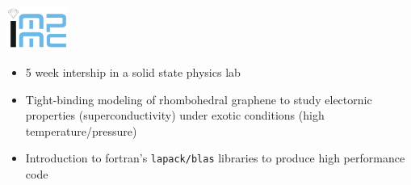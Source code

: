 \noindent
\begin{minipage}{.15\textwidth}
    \centerline{\includegraphics[width=20mm]{img/impmc}}
\end{minipage}%
\hspace{5mm}
\begin{minipage}{.8\textwidth}
    \raggedright
    \begin{itemize}
	\item 5 week intership in a solid state physics lab
	\item Tight-binding modeling of rhombohedral graphene to study electornic properties (superconductivity) under exotic conditions (high temperature/pressure)
	\item Introduction to fortran's \texttt{lapack/blas} libraries to produce high performance code
    \end{itemize}
\end{minipage}
